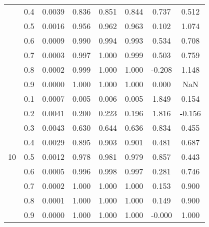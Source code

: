 \documentclass[11pt,a4paper]{report}
\begin{document}
\begin{longtable}{ | c | c || c | c | c | c | c | c | }
 & 0.4 & 0.0039 & 0.836 & 0.851 & 0.844 & 0.737 & 0.512 \\
 & 0.5 & 0.0016 & 0.956 & 0.962 & 0.963 & 0.102 & 1.074 \\
 & 0.6 & 0.0009 & 0.990 & 0.994 & 0.993 & 0.534 & 0.708 \\
 & 0.7 & 0.0003 & 0.997 & 1.000 & 0.999 & 0.503 & 0.759 \\
 & 0.8 & 0.0002 & 0.999 & 1.000 & 1.000 & -0.208 & 1.148 \\
 & 0.9 & 0.0000 & 1.000 & 1.000 & 1.000 & 0.000 & NaN \\
 \hline
\multirow{9}{*}{10} & 0.1 & 0.0007 & 0.005 & 0.006 & 0.005 & 1.849 & 0.154 \\
 & 0.2 & 0.0041 & 0.200 & 0.223 & 0.196 & 1.816 & -0.156 \\
 & 0.3 & 0.0043 & 0.630 & 0.644 & 0.636 & 0.834 & 0.455 \\
 & 0.4 & 0.0029 & 0.895 & 0.903 & 0.901 & 0.481 & 0.687 \\
 & 0.5 & 0.0012 & 0.978 & 0.981 & 0.979 & 0.857 & 0.443 \\
 & 0.6 & 0.0005 & 0.996 & 0.998 & 0.997 & 0.281 & 0.746 \\
 & 0.7 & 0.0002 & 1.000 & 1.000 & 1.000 & 0.153 & 0.900 \\
 & 0.8 & 0.0001 & 1.000 & 1.000 & 1.000 & 0.149 & 0.900 \\
 & 0.9 & 0.0000 & 1.000 & 1.000 & 1.000 & -0.000 & 1.000 \\
 \hline
\hline
\end{longtable}
\end{document}
